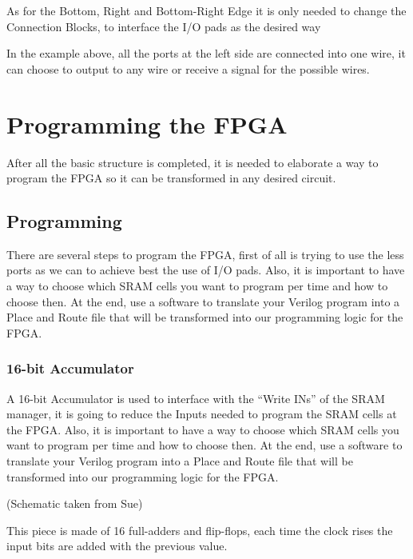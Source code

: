 \documentclass[letterpaper,10pt,english]{sphinxmanual}
\begin{document}
As for the Bottom, Right and Bottom-Right Edge it is only needed to change the Connection Blocks, to interface the I/O pads as the desired way

\noindent{}

In the example above, all the ports at the left side are connected into one wire, it can choose to output to any wire or receive a signal for the possible wires.


\chapter{Programming the FPGA}
\label{index:programming-the-fpga}
After all the basic structure is completed, it is needed to elaborate a way to program the FPGA so it can be transformed in any desired circuit.


\section{Programming}
\label{programming:programming}\label{programming::doc}
There are several steps to program the FPGA, first of all is trying to use the less ports as we can to achieve best the use of I/O pads. Also, it is important to have a way to choose which SRAM cells you want to program per time and how to choose then. At the end, use a software to translate your Verilog program into a Place and Route file that will be transformed into our programming logic for the FPGA.


\subsection{16-bit Accumulator}
\label{16accumulator:bit-accumulator}\label{16accumulator::doc}
A 16-bit Accumulator is used to interface with the ``Write INs'' of the SRAM manager, it is going to reduce the Inputs needed to program the SRAM cells at the FPGA. Also, it is important to have a way to choose which SRAM cells you want to program per time and how to choose then. At the end, use a software to translate your Verilog program into a Place and Route file that will be transformed into our programming logic for the FPGA.

\noindent{}

(Schematic taken from Sue)

This piece is made of 16 full-adders and flip-flops, each time the clock rises the input bits are added with the previous value.
\end{document}
